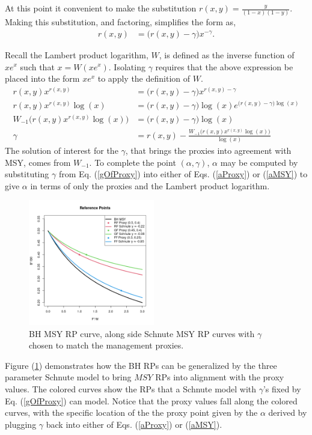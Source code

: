 %
At this point it convenient to make the substitution $r(x,y)=\frac{y}{(1-x)(1-y)}$. Making this substitution, and factoring, simplifies the form as,
%
\begin{align}
r(x,y)&=\Big(r(x,y)-\gamma\Big)x^{-\gamma}.
\end{align}

%
Recall the Lambert product logarithm, $W$, is defined as the inverse function of $x e^x$ such that $x=W(xe^x)$.
Isolating $\gamma$ requires that the above expression be placed into the form $xe^x$ to apply the definition of $W$. %
\begin{align}
r(x, y)x^{r(x, y)}&=\Big(r(x, y)-\gamma\Big)x^{r(x, y)-\gamma} \nonumber\\
r(x, y)x^{r(x, y)}\log(x) &= \Big(r(x, y)-\gamma\Big)\log(x) e^{\big(r(x, y)-\gamma\big)\log(x)} \nonumber\\
W_{-1}\Big(r(x, y)x^{r(x, y)}\log(x)\Big) &= \Big(r(x, y)-\gamma\Big)\log(x) \nonumber\\
\gamma &= r(x, y)-\frac{W_{-1}\Big(r(x, y)x^{r(x, y)}\log(x)\Big)}{\log(x)} \label{gOfProxy}
\end{align}
%
The solution of interest for the $\gamma$, that brings the proxies into agreement 
with MSY, comes from $W_{-1}$.
%
To complete the point $(\alpha, \gamma)$, $\alpha$ may be computed by 
substituting $\gamma$ from Eq. (\ref{gOfProxy}) into either of 
Eqs. (\ref{aProxy}) or (\ref{aMSY}) to give $\alpha$ in terms of only the proxies and the Lambert product logarithm. 

\begin{figure}
\includegraphics[width=0.49\textwidth]{../gpBias/rpProxAll0.2.png}
\caption{\label{rpProxCurves}BH MSY RP curve, along side Schnute MSY RP curves with $\gamma$ chosen to match the management proxies.}
\end{figure}
%
Figure (\ref{rpProxCurves}) demonstrates how the BH RPs can be generalized by 
the three parameter Schnute model to bring $MSY$ RPs into alignment with the 
proxy values. The colored curves show the RPs that a Schnute model with 
$\gamma$'s fixed by Eq. (\ref{gOfProxy}) can model. Notice that the proxy values 
fall along the colored curves, with the specific location of the the proxy point 
given by the $\alpha$ derived by plugging $\gamma$ back into either of Eqs. (\ref{aProxy}) 
or (\ref{aMSY}).

